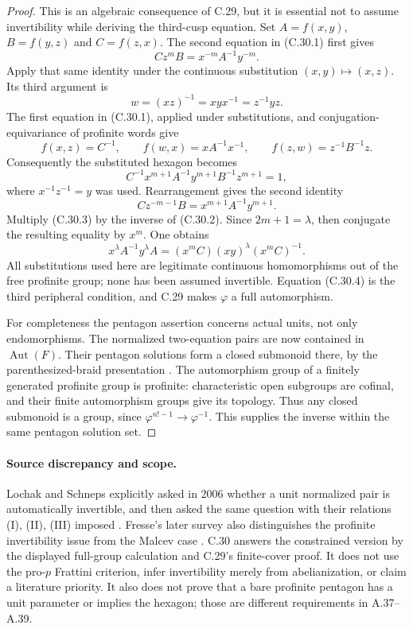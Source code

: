 \begin{proof}
This is an algebraic consequence of C.29, but it is essential not to
assume invertibility while deriving the third-cusp equation.
Set $A=f(x,y)$, $B=f(y,z)$ and $C=f(z,x)$. The second equation in
(C.30.1) first gives
\[
                C z^m B=x^{-m}A^{-1}y^{-m}.                      \tag{C.30.2}
\]
Apply that same identity under the continuous substitution
$(x,y)\mapsto(x,z)$. Its third argument is
\[
                w=(xz)^{-1}=xyx^{-1}=z^{-1}yz.
\]
The first equation in (C.30.1), applied under substitutions, and
conjugation-equivariance of profinite words give
\[
 f(x,z)=C^{-1},\qquad
 f(w,x)=xA^{-1}x^{-1},\qquad
 f(z,w)=z^{-1}B^{-1}z.
\]
Consequently the substituted hexagon becomes
\[
 C^{-1}x^{m+1}A^{-1}y^{m+1}B^{-1}z^{m+1}=1,
\]
where $x^{-1}z^{-1}=y$ was used. Rearrangement gives the second identity
\[
          C z^{-m-1}B=x^{m+1}A^{-1}y^{m+1}.                     \tag{C.30.3}
\]
Multiply (C.30.3) by the inverse of (C.30.2). Since $2m+1=\lambda$,
then conjugate the resulting equality by $x^m$. One obtains
\[
 x^\lambda A^{-1}y^\lambda A
       =(x^mC)(xy)^\lambda(x^mC)^{-1}.                         \tag{C.30.4}
\]
All substitutions used here are legitimate continuous homomorphisms
out of the free profinite group; none has been assumed invertible.
Equation (C.30.4) is the third peripheral condition, and C.29 makes
$\varphi$ a full automorphism.

For completeness the pentagon assertion concerns actual units, not
only endomorphisms. The normalized two-equation pairs are now
contained in $\operatorname{Aut}(F)$. Their pentagon solutions form
a closed submonoid there, by the parenthesized-braid presentation
\cite[Lemma 7.1 and Proposition 7.3]{CEBHR2019}. The automorphism group
of a finitely generated profinite group is profinite: characteristic
open subgroups are cofinal, and their finite automorphism groups
give its topology. Thus any closed submonoid is a group, since
$\varphi^{n!-1}\to\varphi^{-1}$. This supplies the inverse within
the same pentagon solution set.
\end{proof}

\paragraph{Source discrepancy and scope.}
Lochak and Schneps explicitly asked in 2006 whether a unit normalized
pair is automatically invertible, and then asked the same question
with their relations (I), (II), (III) imposed
\cite[Question 1.1]{A_LS2006}. Fresse's later survey also distinguishes
the profinite invertibility issue from the Malcev case
\cite[\S1.1, manuscript p.~14]{CEFresse2019}.
C.30 answers the constrained version by the displayed full-group
calculation and C.29's finite-cover proof. It does not use the
pro-$p$ Frattini criterion, infer invertibility merely from
abelianization, or claim a literature priority. It also does not
prove that a bare profinite pentagon has a unit parameter or implies
the hexagon; those are different requirements in A.37--A.39.

